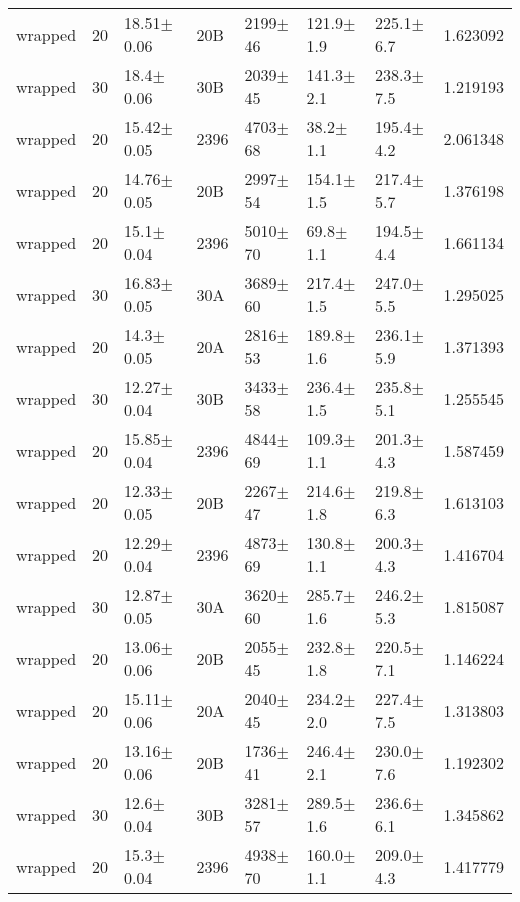 \begin{tabular}{lrlllllr}
      wrapped &      20 &   18.51$\pm$0.06 &     20B &  2199$\pm$46 &   121.9$\pm$1.9 &   225.1$\pm$6.7 &    1.623092 \\
      wrapped &      30 &    18.4$\pm$0.06 &     30B &  2039$\pm$45 &   141.3$\pm$2.1 &   238.3$\pm$7.5 &    1.219193 \\
      wrapped &      20 &   15.42$\pm$0.05 &    2396 &  4703$\pm$68 &    38.2$\pm$1.1 &   195.4$\pm$4.2 &    2.061348 \\
      wrapped &      20 &   14.76$\pm$0.05 &     20B &  2997$\pm$54 &   154.1$\pm$1.5 &   217.4$\pm$5.7 &    1.376198 \\
      wrapped &      20 &    15.1$\pm$0.04 &    2396 &  5010$\pm$70 &    69.8$\pm$1.1 &   194.5$\pm$4.4 &    1.661134 \\
      wrapped &      30 &   16.83$\pm$0.05 &     30A &  3689$\pm$60 &   217.4$\pm$1.5 &   247.0$\pm$5.5 &    1.295025 \\
      wrapped &      20 &    14.3$\pm$0.05 &     20A &  2816$\pm$53 &   189.8$\pm$1.6 &   236.1$\pm$5.9 &    1.371393 \\
      wrapped &      30 &   12.27$\pm$0.04 &     30B &  3433$\pm$58 &   236.4$\pm$1.5 &   235.8$\pm$5.1 &    1.255545 \\
      wrapped &      20 &   15.85$\pm$0.04 &    2396 &  4844$\pm$69 &   109.3$\pm$1.1 &   201.3$\pm$4.3 &    1.587459 \\
      wrapped &      20 &   12.33$\pm$0.05 &     20B &  2267$\pm$47 &   214.6$\pm$1.8 &   219.8$\pm$6.3 &    1.613103 \\
      wrapped &      20 &   12.29$\pm$0.04 &    2396 &  4873$\pm$69 &   130.8$\pm$1.1 &   200.3$\pm$4.3 &    1.416704 \\
      wrapped &      30 &   12.87$\pm$0.05 &     30A &  3620$\pm$60 &   285.7$\pm$1.6 &   246.2$\pm$5.3 &    1.815087 \\
      wrapped &      20 &   13.06$\pm$0.06 &     20B &  2055$\pm$45 &   232.8$\pm$1.8 &   220.5$\pm$7.1 &    1.146224 \\
      wrapped &      20 &   15.11$\pm$0.06 &     20A &  2040$\pm$45 &   234.2$\pm$2.0 &   227.4$\pm$7.5 &    1.313803 \\
      wrapped &      20 &   13.16$\pm$0.06 &     20B &  1736$\pm$41 &   246.4$\pm$2.1 &   230.0$\pm$7.6 &    1.192302 \\
      wrapped &      30 &    12.6$\pm$0.04 &     30B &  3281$\pm$57 &   289.5$\pm$1.6 &   236.6$\pm$6.1 &    1.345862 \\
      wrapped &      20 &    15.3$\pm$0.04 &    2396 &  4938$\pm$70 &   160.0$\pm$1.1 &   209.0$\pm$4.3 &    1.417779 \\

\end{tabular}
